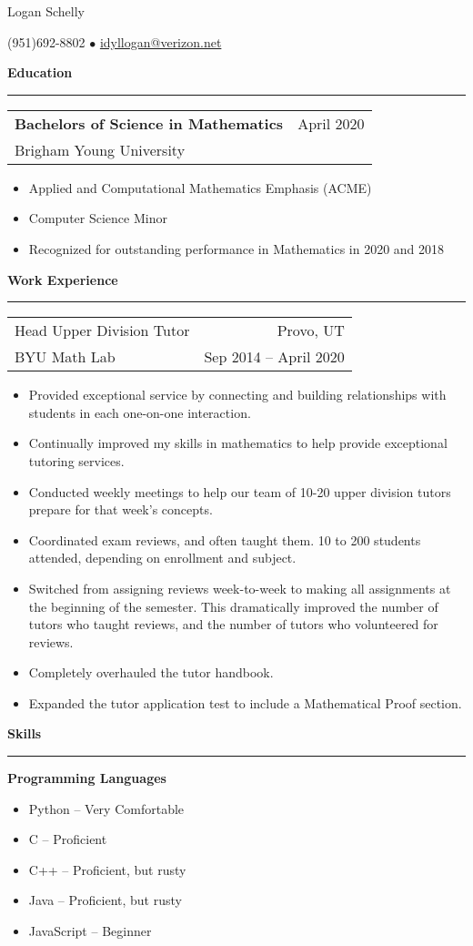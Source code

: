 \documentclass{article}
\newenvironment{compactItemize}{
  \begin{itemize}[itemsep=0ex, parsep=0ex, partopsep=0ex, topsep= -7pt]
}{
  \end{itemize}
}
\newcommand{\jobInfo}[4]{
  \begingroup
  \setlength{\tabcolsep}{0ex}
  \begin{tabularx}{\linewidth}{X r}
    #1 & %
    #2\\ %
    #3 & %
    #4   %
  \end{tabularx}%
  \endgroup%
}
\newcommand{\degree}[4]{
  \jobInfo{\textbf{#1}}{#2}{#3}{#4}
}
\begin{document}
\begin{center}
{\Large Logan Schelly} %

(951)\phantom{-}692-8802 %
$\bullet$ %
\href{mailto:idyllogan@verizon.net}{idyllogan@verizon.net} %
\end{center}
\textbf{Education}
\smallskip
\hrule

\degree{Bachelors of Science in Mathematics}{April 2020}{Brigham Young University}{}
%
\begin{compactItemize}
  \item Applied and Computational Mathematics Emphasis (ACME)
  \item Computer Science Minor
  \item Recognized for outstanding performance in Mathematics in 2020 and 2018
\end{compactItemize}
\medskip

\textbf{Work Experience}
\smallskip
\hrule

\jobInfo{Head Upper Division Tutor}{Provo, UT}{BYU Math Lab}{Sep 2014 -- April 2020}
\begin{compactItemize}
  \item Provided exceptional service by connecting and building relationships with students in each one-on-one interaction.
  \item Continually improved my skills in mathematics to help provide exceptional tutoring services.
  \item Conducted weekly meetings to help our team of 10-20 upper division tutors prepare for that week's concepts.
  \item Coordinated exam reviews, and often taught them.  10 to 200 students attended, depending on enrollment and subject.
  \item Switched from assigning reviews week-to-week to making all assignments at the beginning of the semester.
        This dramatically improved the number of tutors who taught reviews, and the number of tutors who volunteered for reviews.
  \item Completely overhauled the tutor handbook.
  \item Expanded the tutor application test to include a Mathematical Proof section.
\end{compactItemize}
\medskip

\textbf{Skills}
\smallskip
\hrule
\textbf{Programming Languages}
\begin{multicols}{2}
\begin{compactItemize}
  \item Python -- Very Comfortable
  \item C -- Proficient
  \item C++ -- Proficient, but rusty
  \item Java -- Proficient, but rusty
  \item JavaScript -- Beginner
\end{compactItemize}
\end{multicols}
\end{document}
